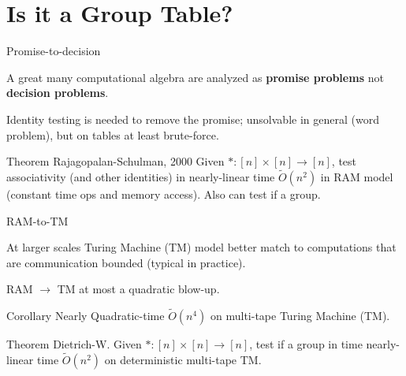 \documentclass{beamer}
\begin{document}



\section{Is it a Group Table?}

\begin{frame}{Promise-to-decision}

A great many computational algebra are analyzed as \textbf{promise problems}
not \textbf{decision problems}.

Identity testing is needed to remove the promise; unsolvable in general (word problem), 
but on tables at least brute-force.
\pause

\begin{block}{Theorem Rajagopalan-Schulman, 2000}
    Given $*:[n]\times [n]\to [n]$, test associativity (and other identities) in
    nearly-linear time $\tilde{O}(n^2)$ in RAM model (constant time ops and
    memory access). Also can test if a group.
\end{block}

\end{frame}

\begin{frame}{RAM-to-TM}

At larger scales Turing Machine (TM) model better match to computations 
that are communication bounded (typical in practice).

RAM $\to$ TM at most a quadratic blow-up.
\begin{block}{Corollary}
Nearly Quadratic-time $\tilde{O}(n^4)$ on multi-tape Turing Machine (TM).
\end{block}

\pause
\begin{block}{Theorem Dietrich-W.}
    Given $*:[n]\times [n]\to [n]$,
    test if a group in time nearly-linear time
    $\tilde{O}(n^2)$ on deterministic multi-tape TM.
\end{block}

\end{frame}
\end{document}
